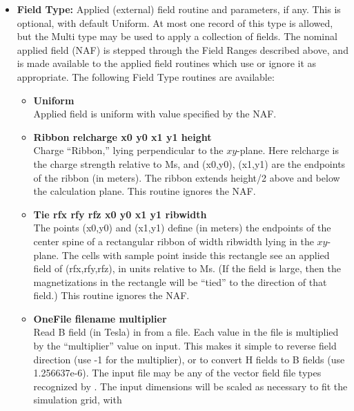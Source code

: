 \begin{itemize}
   \item {\bf Field Type:} Applied (external) field
     routine and parameters, if any. This is optional, with default
     Uniform.  At most one record of this type is allowed, but the Multi
     type may be used to apply a collection of fields.  The nominal
     applied field (NAF) is stepped through the Field Ranges described
     above, and is made available to the applied field routines which
     use or ignore it as appropriate.  \html{\\}\latex{\par} The
     following Field Type routines are available:
     \begin{itemize}
        \item {\bf Uniform}\\
          Applied field is uniform with value specified by the NAF.
        \item {\bf Ribbon relcharge x0 y0 x1 y1 height}\\
          Charge ``Ribbon,'' lying perpendicular to the $xy$-plane.
          Here relcharge is the charge strength relative to Ms, and
          (x0,y0), (x1,y1) are the endpoints of the ribbon (in
          meters).  The ribbon extends height/2 above and below the
          calculation plane.  This routine ignores the NAF.
        \item {\bf Tie rfx rfy rfz x0 y0 x1 y1 ribwidth}\\
          The points (x0,y0) and (x1,y1) define (in meters) the
          endpoints of the center spine of a rectangular ribbon of
          width ribwidth lying in the $xy$-plane.  The cells with
          sample point inside this rectangle see an applied field of
          (rfx,rfy,rfz), in units relative to Ms.  (If the field is
          large, then the magnetizations in the rectangle will be
          ``tied'' to the direction of that field.)  This routine
          ignores the NAF.
        \item {\bf OneFile filename multiplier}\\
          Read B field (in Tesla) in from a file.  Each value in the
          file is multiplied by the ``multiplier'' value on input.  This
          makes it simple to reverse field direction (use -1 for the
          multiplier), or to convert H fields to B fields (use
          1.256637e-6).  The input file may be any of the vector field
          file types recognized by .  The input dimensions
          will be scaled as necessary to fit the simulation grid, with

\end{itemize}
\end{itemize}

